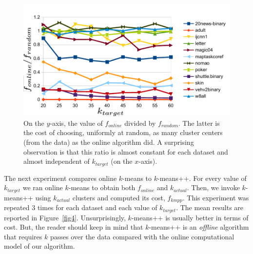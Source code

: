 \documentclass{article}
\begin{document}
\begin{figure}[htbp]
\begin{center}
\includegraphics{figures/plot3.pdf}
\caption{On the $y$-axis, the value of $f_{online}$ divided by $f_{random}$. 
The latter is the cost of choosing, uniformly at random, as many cluster centers (from the data) as the online algorithm did.
A surprising observation is that this ratio is almost constant for each dataset and almost independent of $k_{target}$ (on the $x$-axis).}
\label{fig3}
\end{center}
\end{figure}

The next experiment compares online $k$-means to $k$-means++.
For every value of $k_{target}$ we ran online $k$-means to obtain both $f_{online}$ and $k_{actual}$.
Then, we invoke $k$-means++ using $k_{actual}$ clusters and computed its cost, $f_{kmpp}$.
This experiment was repeated $3$ times for each dataset and each value of $k_{target}$.
The mean results are reported in Figure~\ref{fig4}. 
Unsurprisingly, $k$-means++ is usually better in terms of cost. But, the reader should keep in mind that
$k$-means++ is an \emph{offline} algorithm that requires $k$ passes over the data compared with the online computational model of our algorithm.
\end{document}
